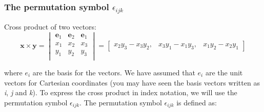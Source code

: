 \documentclass[notes]{beamer}
\begin{document}
\begin{frame}
\frametitle{The permutation symbol $\epsilon_{ijk}$}
Cross product of two vectors:
\begin{equation*}
\mathbf{x \times y} = 
\begin{vmatrix}
\mathbf{e}_1 & \mathbf{e}_2 & \mathbf{e}_1 \\
x_1 & x_2 & x_3 \\
y_1 & y_2 & y_3 \\
\end{vmatrix} = 
\begin{bmatrix}
x_2 y_3 - x_3 y_2, & x_3 y_1 - x_1 y_3, &
x_1 y_2 - x_2 y_1
\end{bmatrix}
\end{equation*}

where $e_i$ are the basis for the vectors. We have assumed that $e_i$ are the unit vectors for
Cartesian coordinates (you may have seen the basis vectors written as \textit{i}, \textit{j} and \textit{k}). To express the cross product in index notation, we will use the permutation symbol $\epsilon_{ijk}$. The permutation symbol $\epsilon_{ijk}$ is defined as:
\end{frame}
\end{document}
